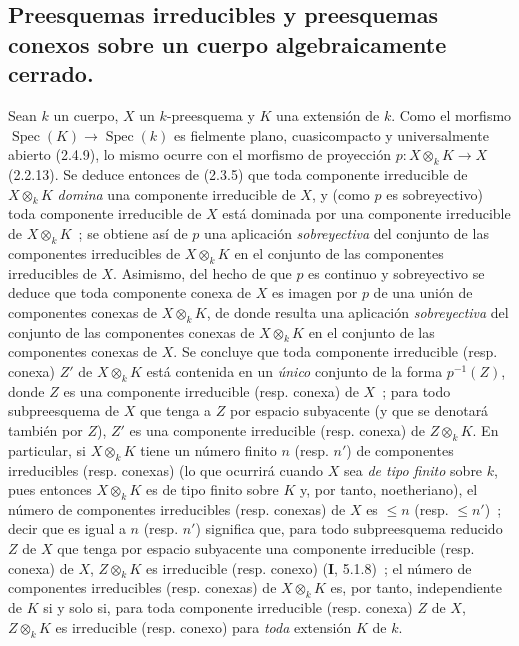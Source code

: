 \subsection{Preesquemas irreducibles y preesquemas conexos sobre un cuerpo
algebraicamente cerrado.}
\label{subsection:IV.2.4.4-fr}

\begin{env}[4.4.1]
\label{IV.2.4.4.1-fr}
Sean $k$ un cuerpo, $X$ un $k$-preesquema y $K$ una extensión de $k$. Como el
morfismo $\operatorname{Spec}(K)\to\operatorname{Spec}(k)$ es fielmente plano,
cuasicompacto y universalmente abierto (2.4.9), lo mismo ocurre con el morfismo
de proyección $p:X\otimes_k K\to X$ (2.2.13). Se deduce entonces de (2.3.5) que
toda componente irreducible de $X\otimes_k K$ \emph{domina} una componente
irreducible de $X$, y (como $p$ es sobreyectivo) toda componente irreducible de
$X$ está dominada por una componente irreducible de $X\otimes_k K$~; se obtiene
así de $p$ una aplicación \emph{sobreyectiva} del conjunto de las componentes
irreducibles de $X\otimes_k K$ en el conjunto de las componentes irreducibles
de $X$. Asimismo, del hecho de que $p$ es continuo y sobreyectivo se deduce que
toda componente conexa de $X$ es imagen por $p$ de una unión de componentes
conexas de $X\otimes_k K$, de donde resulta una aplicación \emph{sobreyectiva}
del conjunto de las componentes conexas de $X\otimes_k K$ en el conjunto de las
componentes conexas de $X$. Se concluye que toda componente irreducible (resp.
conexa) $Z'$ de $X\otimes_k K$ está contenida en un \emph{único} conjunto de la
forma $p^{-1}(Z)$, donde $Z$ es una componente irreducible (resp. conexa) de
$X$~; para todo subpreesquema de $X$ que tenga a $Z$ por espacio subyacente (y
que se denotará también por $Z$), $Z'$ es una componente irreducible (resp.
conexa) de $Z\otimes_k K$. En particular, si $X\otimes_k K$ tiene un número
finito $n$ (resp. $n'$) de componentes irreducibles (resp. conexas) (lo que
ocurrirá cuando $X$ sea \emph{de tipo finito} sobre $k$, pues entonces
$X\otimes_k K$ es de tipo finito sobre $K$ y, por tanto, noetheriano), el número
de componentes irreducibles (resp. conexas) de $X$ es $\leqslant n$ (resp.
$\leqslant n'$)~; decir que es igual a $n$ (resp. $n'$) significa que, para todo
subpreesquema reducido $Z$ de $X$ que tenga por espacio subyacente una
componente irreducible (resp. conexa) de $X$, $Z\otimes_k K$ es irreducible
(resp. conexo) (\textbf I, 5.1.8)~; el número de componentes irreducibles (resp.
conexas) de $X\otimes_k K$ es, por tanto, independiente de $K$ si y solo si,
para toda componente irreducible (resp. conexa) $Z$ de $X$, $Z\otimes_k K$ es
irreducible (resp. conexo) para \emph{toda} extensión $K$ de $k$.


\end{env}
